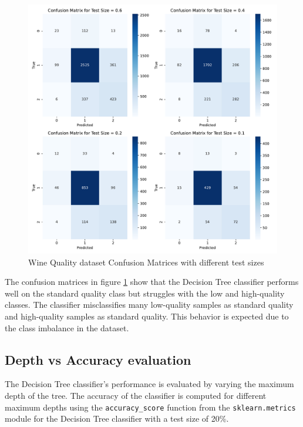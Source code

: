 \begin{figure}[H]
    \centering
    \includegraphics[width=.7\textwidth]{figures/wine_quality_confusion_matrices.pdf}
    \caption{Wine Quality dataset Confusion Matrices with different test sizes}
    \label{fig:wine_quality_confusion_matrices}
\end{figure}

The confusion matrices in figure \ref{fig:wine_quality_confusion_matrices} show that the Decision Tree classifier performs well on the standard quality class but struggles with the low and high-quality classes. The classifier misclassifies many low-quality samples as standard quality and high-quality samples as standard quality. This behavior is expected due to the class imbalance in the dataset.

\subsection{Depth vs Accuracy evaluation}

The Decision Tree classifier's performance is evaluated by varying the maximum depth of the tree. The accuracy of the classifier is computed for different maximum depths using the \texttt{accuracy\_score} function from the \texttt{sklearn.metrics} module for the Decision Tree classifier with a test size of 20\%.

